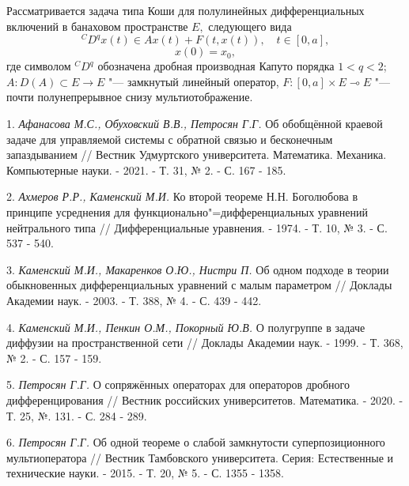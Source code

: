
\vzmscaption

Рассматривается задача типа Коши для полулинейных дифференциальных включений в банаховом пространстве $E,$ следующего вида
$$
  ^CD^q x\left( t\right)\in Ax(t)+F(t,x(t)),\quad t \in \left[0,a\right],
$$
$$
x(0)=x_0,
$$
где символом $^{C}D^{q}$ обозначена дробная производная Капуто порядка  $1<q<2$; $A:D(A)\subset E \rightarrow E$ "--- замкнутый линейный оператор, $F: [0,a] \times  E \multimap E$ "--- почти полунепрерывное снизу мультиотображение.


\litlist

1. {\it Афанасова М.С., Обуховский В.В., Петросян Г.Г.} Об обобщённой краевой задаче для управляемой системы с обратной связью и бесконечным запаздыванием // Вестник Удмуртского университета. Математика. Механика. Компьютерные науки. - 2021. - Т. 31, № 2. -  С. 167 - 185.

2. {\it Ахмеров Р.Р., Каменский М.И.}  Ко второй теореме Н.Н. Боголюбова в принципе усреднения для функционально"=дифференциальных уравнений нейтрального типа // Дифференциальные уравнения. - 1974. - Т. 10, № 3. - С. 537 - 540.

3. {\it Каменский М.И., Макаренков О.Ю., Нистри П.} Об одном подходе в теории обыкновенных дифференциальных уравнений с малым параметром // Доклады Академии наук. - 2003. - Т. 388, № 4. - С. 439 - 442.

4. {\it Каменский М.И., Пенкин О.М., Покорный Ю.В.} О полугруппе в задаче диффузии на пространственной сети // Доклады Академии наук. - 1999. - Т. 368, № 2. - С. 157 - 159.

5.	{\it Петросян Г.Г.} О сопряжённых операторах для операторов дробного дифференцирования // Вестник российских университетов. Математика. - 2020. - Т. 25, №. 131. - С. 284 - 289.

6. {\it Петросян Г.Г.}  Об одной теореме о слабой замкнутости суперпозиционного мультиоператора // Вестник Тамбовского университета. Серия: Естественные и технические науки. - 2015. - Т. 20, № 5. - С. 1355 - 1358.

